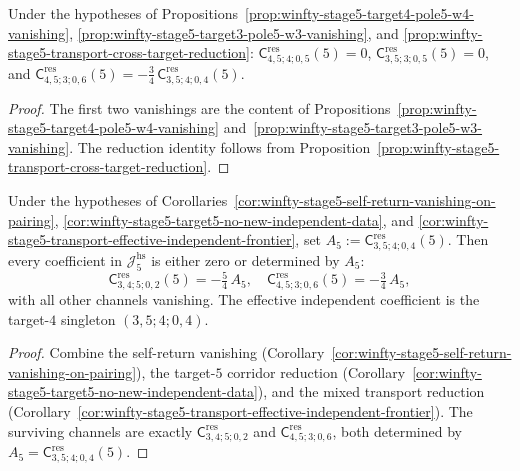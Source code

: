 \begin{corollary}
\label{cor:winfty-stage5-transport-effective-independent-frontier}
Under the hypotheses of
Propositions~\ref{prop:winfty-stage5-target4-pole5-w4-vanishing},
\ref{prop:winfty-stage5-target3-pole5-w3-vanishing}, and
\ref{prop:winfty-stage5-transport-cross-target-reduction}:
$\mathsf{C}^{\mathrm{res}}_{4,5;4;0,5}(5)=0$,
$\mathsf{C}^{\mathrm{res}}_{3,5;3;0,5}(5)=0$, and
$\mathsf{C}^{\mathrm{res}}_{4,5;3;0,6}(5)
=
-\frac{3}{4}\,
\mathsf{C}^{\mathrm{res}}_{3,5;4;0,4}(5)$.
\end{corollary}

\begin{proof}
The first two vanishings are the content of
Propositions~\ref{prop:winfty-stage5-target4-pole5-w4-vanishing}
and~\ref{prop:winfty-stage5-target3-pole5-w3-vanishing}.
The reduction identity follows from
Proposition~\ref{prop:winfty-stage5-transport-cross-target-reduction}.
\end{proof}

\begin{corollary}
\label{cor:winfty-stage5-effective-independent-frontier}
Under the hypotheses of
Corollaries~\ref{cor:winfty-stage5-self-return-vanishing-on-pairing},
\ref{cor:winfty-stage5-target5-no-new-independent-data}, and
\ref{cor:winfty-stage5-transport-effective-independent-frontier},
set $A_5:=\mathsf{C}^{\mathrm{res}}_{3,5;4;0,4}(5)$.
Then every coefficient in $\mathcal{J}_5^{\mathrm{hs}}$ is either zero or determined by $A_5$:
\[
\mathsf{C}^{\mathrm{res}}_{3,4;5;0,2}(5)=-\tfrac{5}{4}\,A_5,
\quad
\mathsf{C}^{\mathrm{res}}_{4,5;3;0,6}(5)=-\tfrac{3}{4}\,A_5,
\]
with all other channels vanishing.
The effective independent coefficient is the target-$4$
singleton \((3,5;4;0,4)\).
\end{corollary}

\begin{proof}
Combine the self-return vanishing
(Corollary~\ref{cor:winfty-stage5-self-return-vanishing-on-pairing}),
the target-$5$ corridor reduction
(Corollary~\ref{cor:winfty-stage5-target5-no-new-independent-data}),
and the mixed transport reduction
(Corollary~\ref{cor:winfty-stage5-transport-effective-independent-frontier}).
The surviving channels are exactly $\mathsf{C}^{\mathrm{res}}_{3,4;5;0,2}$
and $\mathsf{C}^{\mathrm{res}}_{4,5;3;0,6}$, both determined by
$A_5 = \mathsf{C}^{\mathrm{res}}_{3,5;4;0,4}(5)$.
\end{proof}

